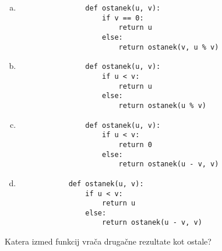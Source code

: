 \documentclass[arhiv, 10pt]{../izpit}
\begin{document}
        \begin{multicols}{2}
        \begin{enumerate}[(a)]
\item 
                \begin{verbatim}
                def ostanek(u, v):
                    if v == 0:
                        return u
                    else:
                        return ostanek(v, u % v)
                \end{verbatim}
            
\item 
                \begin{verbatim}
                def ostanek(u, v):
                    if u < v:
                        return u
                    else:
                        return ostanek(u % v)
                \end{verbatim}
            
\item 
                \begin{verbatim}
                def ostanek(u, v):
                    if u < v:
                        return 0
                    else:
                        return ostanek(u - v, v)
                \end{verbatim}
            
\item 
            \begin{verbatim}
            def ostanek(u, v):
                if u < v:
                    return u
                else:
                    return ostanek(u - v, v)
            \end{verbatim}
        
\end{enumerate}

        \end{multicols}
    
        \naloga*
        
        Katera izmed funkcij vrača drugačne rezultate kot ostale?
    
\end{document}

